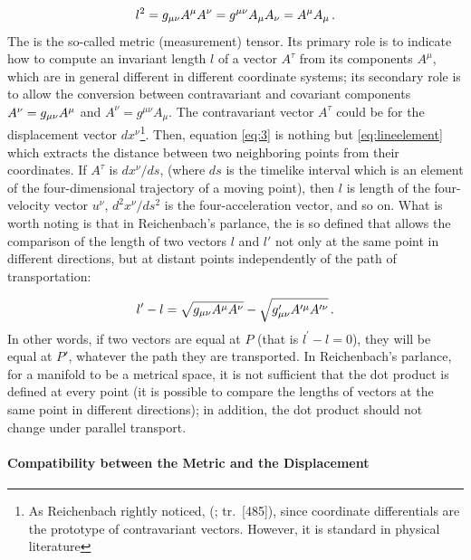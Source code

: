 \documentclass[submitted]{article}
\newcommand{\labtag}[1]{\label{#1}}
\newcommand{\til}{timelike\xspace}
\renewcommand{\rzlap}[2]{(\cite[#1]{Reichenbach1928}; tr.\ [#2])\xspace}
\begin{document}
 
\begin{equation}\labtag{eq:3}
l^2=\gmn A^\mu A^\nu = g^{\mu\nu} A_\mu A_\nu = A^\mu A_\mu\,.
\end{equation}
%
The \gmn is the so-called metric (\ie measurement) tensor. Its primary role is to indicate how to compute an invariant length $l$ of a vector $A^\tau$ from its components $A^\mu$, which are in general different in different coordinate systems; its secondary role is to allow the conversion between contravariant and covariant components $A^\nu = g_{\mu\nu} A^\mu$ and $A^\nu = g^{\mu \nu} A_\mu$. The contravariant vector $A^\tau$ could be for the displacement vector $dx^\nu$\footnote{As Reichenbach rightly noticed,  \rzlap{348}{485\fn}, since coordinate differentials are the prototype of contravariant vectors. However, it is standard in physical literature}. Then, equation \cref{eq:3} is nothing but \cref{eq:lineelement} which extracts the distance between two neighboring points from their coordinates. If $A^\tau$ is $dx^\nu/ds$, (where $ds$ is the \til interval which is an element of the four-dimensional trajectory of a moving point), then $l$ is length of the four-velocity vector $u^\nu$, $d^{2} x^{\nu} / d s^{2}$ is the four-acceleration vector, and so on. What is worth noting is that in Reichenbach's parlance, the  \gmn is so defined that allows the comparison of the length of two vectors $l$ and $l'$ not only at the same point in different directions, but at distant points independently of the path of transportation:

\begin{equation*}
l^{\prime}-l=\sqrt{g_{\mu\nu} A^\mu A^\nu}-\sqrt{g_{\mu\nu}^{\prime} A^{\prime\mu} A^{\prime\nu}}\,.
\end{equation*}
%
In other words, if two vectors are equal at $P$ (that is $l^{\prime}-l=0$), they will be equal at $P'$, whatever the path they are transported. In Reichenbach's parlance, for a manifold to be a metrical space, it is not sufficient that the dot product is defined at every point (\ie it is possible to compare the lengths of vectors at the same point in different directions); in addition, the dot product should not change under parallel transport.

\paragraph{Compatibility between the Metric and the Displacement}
\end{document}
